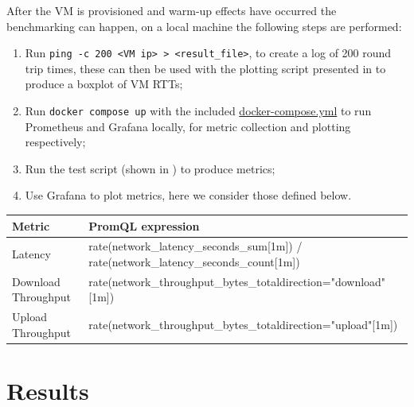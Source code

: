 \documentclass[11pt,a4paper]{article}
\begin{document}
After the VM is provisioned and warm-up effects have occurred the benchmarking can happen, on a local machine the following steps are performed:
\begin{enumerate}
  \item{Run \texttt{ping -c 200 <VM ip> > <result\_file>}, to create a log of 200 round trip times, these can then be used with the plotting script presented in  to produce a boxplot of VM RTTs;}
  \item{Run \texttt{docker compose up} with the included \href{https://github.com/StefVuck/CloudSystemsAE1/blob/f39212e9e3b1d692e06152948270db8c1668b140/network-client/docker-compose.yml}{docker-compose.yml} to run Prometheus and Grafana locally, for metric collection and plotting respectively;}
  \item{Run the test script (shown in ) to produce metrics;}
  \item{Use Grafana to plot metrics, here we consider those defined below.}
\end{enumerate}

\begin{center}
  \begin{tabular}{ll}
    Metric & PromQL expression \\
    \hline
Latency & rate(network\_latency\_seconds\_sum[1m]) / rate(network\_latency\_seconds\_count[1m]) \\

Download Throughput & rate(network\_throughput\_bytes\_total{direction="download"}[1m]) \\

Upload Throughput & rate(network\_throughput\_bytes\_total{direction="upload"}[1m]) \\

  \end{tabular}
\end{center}

\section*{Results}
\end{document}
